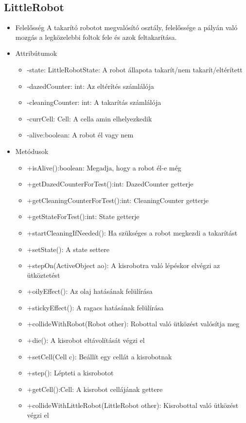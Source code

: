 \subsection{LittleRobot}
\begin{itemize}
	\item Felelősség\newline
	A takarító robotot megvalósító osztály, felelőssége a pályán való mozgás a legközelebbi foltok fele és azok feltakarítása.
	\item Attribútumok\newline
	\begin{itemize}
		\item -state: LittleRobotState: A robot állapota takarít/nem takarít/eltérített
		\item -dazedCounter: int: Az eltérítés számlálója
		\item -cleaningCounter: int: A takarítás számlálója
		\item -currCell: Cell: A cella amin elhelyezkedik
		\item -alive:boolean: A robot él vagy nem
	\end{itemize}
	\item Metódusok\newline
	\begin{itemize}
		\item +isAlive():boolean: Megadja, hogy a robot él-e még
		\item +getDazedCounterForTest():int: DazedCounter getterje
		\item +getCleaningCounterForTest():int: CleaningCounter getterje
		\item +getStateForTest():int: State getterje
		\item +startCleaningIfNeeded(): Ha szükséges a robot megkezdi a takarítást
		\item +setState(): A state settere
		\item +stepOn(ActiveObject ao): A kisrobotra való lépéskor elvégzi az ütköztetést
		\item +oilyEffect(): Az olaj hatásának felülírása
		\item +stickyEffect(): A ragacs hatásának felülírása
		\item +collideWithRobot(Robot other): Robottal való ütközést valósítja meg
		\item +die(): A kisrobot eltávolítását végzi el
		\item +setCell(Cell c): Beállít egy cellát a kisrobotnak
		\item +step(): Lépteti a kisrobotot
		\item +getCell():Cell: A kisrobot cellájának gettere
		\item +collideWithLittleRobot(LittleRobot other): Kisrobottal való ütközést végzi el
\end{itemize}
\end{itemize}

